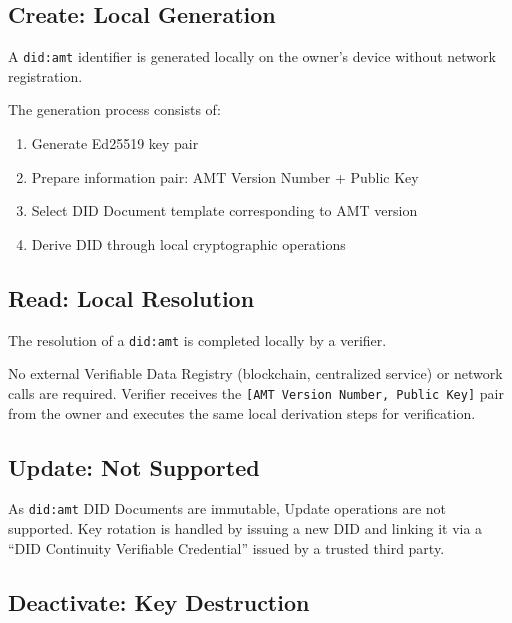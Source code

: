 \subsection{Create: Local Generation}

\begin{theorem}
  \label{thm:did-local-generation}
  A \texttt{did:amt} identifier is generated locally on the owner's device without network registration.

  The generation process consists of:
  \begin{enumerate}
    \item Generate Ed25519 key pair
    \item Prepare information pair: AMT Version Number + Public Key
    \item Select DID Document template corresponding to AMT version
    \item Derive DID through local cryptographic operations
  \end{enumerate}
  \leanok
\end{theorem}

\subsection{Read: Local Resolution}

\begin{theorem}
  \label{thm:did-local-resolution}
  The resolution of a \texttt{did:amt} is completed locally by a verifier.

  No external Verifiable Data Registry (blockchain, centralized service) or network calls are required.
  Verifier receives the \texttt{[AMT Version Number, Public Key]} pair from the owner and executes
  the same local derivation steps for verification.
  \leanok
\end{theorem}

\subsection{Update: Not Supported}

As \texttt{did:amt} DID Documents are immutable, Update operations are not supported. Key rotation is handled by issuing a new DID and linking it via a ``DID Continuity Verifiable Credential'' issued by a trusted third party.

\subsection{Deactivate: Key Destruction}


